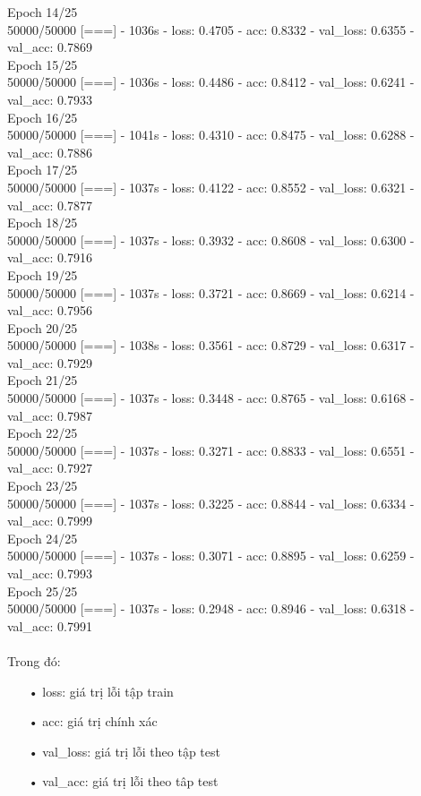 \documentclass[a4paper,12pt]{report}
\begin{document}
{Epoch 14/25 \\
50000/50000 [===] - 1036s - loss: 0.4705 - acc: 0.8332 - val\_loss: 0.6355 - val\_acc: 0.7869 \\
Epoch 15/25 \\
50000/50000 [===] - 1036s - loss: 0.4486 - acc: 0.8412 - val\_loss: 0.6241 - val\_acc: 0.7933 \\
Epoch 16/25 \\
50000/50000 [===] - 1041s - loss: 0.4310 - acc: 0.8475 - val\_loss: 0.6288 - val\_acc: 0.7886 \\
Epoch 17/25 \\
50000/50000 [===] - 1037s - loss: 0.4122 - acc: 0.8552 - val\_loss: 0.6321 - val\_acc: 0.7877 \\
Epoch 18/25 \\
50000/50000 [===] - 1037s - loss: 0.3932 - acc: 0.8608 - val\_loss: 0.6300 - val\_acc: 0.7916 \\
Epoch 19/25 \\
50000/50000 [===] - 1037s - loss: 0.3721 - acc: 0.8669 - val\_loss: 0.6214 - val\_acc: 0.7956 \\
Epoch 20/25 \\
50000/50000 [===] - 1038s - loss: 0.3561 - acc: 0.8729 - val\_loss: 0.6317 - val\_acc: 0.7929\\
Epoch 21/25 \\
50000/50000 [===] - 1037s - loss: 0.3448 - acc: 0.8765 - val\_loss: 0.6168 - val\_acc: 0.7987 \\
Epoch 22/25 \\
50000/50000 [===] - 1037s - loss: 0.3271 - acc: 0.8833 - val\_loss: 0.6551 - val\_acc: 0.7927\\
Epoch 23/25 \\
50000/50000 [===] - 1037s - loss: 0.3225 - acc: 0.8844 - val\_loss: 0.6334 - val\_acc: 0.7999 \\
Epoch 24/25 \\
50000/50000 [===] - 1037s - loss: 0.3071 - acc: 0.8895 - val\_loss: 0.6259 - val\_acc: 0.7993 \\
Epoch 25/25 \\
50000/50000 [===] - 1037s - loss: 0.2948 - acc: 0.8946 - val\_loss: 0.6318 - val\_acc: 0.7991 \\
}
\\
Trong đó:
\begin{itemize}
\item[•] loss: giá trị lỗi tập train
\item[•] acc:  giá trị chính xác
\item[•] val\_loss:  giá trị lỗi theo tập test
\item[•] val\_acc: giá trị lỗi theo tâp test
\end{itemize}
\end{document}
